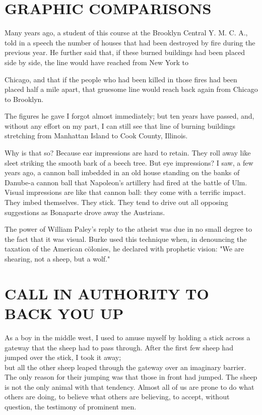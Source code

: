 \documentclass[10pt]{article}
\begin{document}
\section*{GRAPHIC COMPARISONS}
Many years ago, a student of this course at the Brooklyn Central Y. M. C. A., told in a speech the number of houses that had been destroyed by fire during the previous year. He further said that, if these burned buildings had been placed side by side, the line would have reached from New York to

Chicago, and that if the people who had been killed in those fires had been placed half a mile apart, that gruesome line would reach back again from Chicago to Brooklyn.

The figures he gave I forgot almost immediately; but ten years have passed, and, without any effort on my part, I can still see that line of burning buildings stretching from Manhattan Island to Cook County, Illinois.

Why is that so? Because ear impressions are hard to retain. They roll away like sleet striking the smooth bark of a beech tree. But eye impressions? I saw, a few years ago, a cannon ball imbedded in an old house standing on the banks of Danube-a cannon ball that Napoleon's artillery had fired at the battle of Ulm. Visual impressions are like that cannon ball: they come with a terrific impact. They imbed themselves. They stick. They tend to drive out all opposing suggestions as Bonaparte drove away the Austrians.

The power of William Paley's reply to the atheist was due in no small degree to the fact that it was visual. Burke used this technique when, in denouncing the taxation of the American cölonies, he declared with prophetic vision: "We are shearing, not a sheep, but a wolf."

\section*{CALL IN AUTHORITY TO BACK YOU UP}
As a boy in the middle west, I used to amuse myself by holding a stick across a gateway that the sheep had to pass through. After the first few sheep had jumped over the stick, I took it away;\\
but all the other sheep leaped through the gateway over an imaginary barrier. The only reason for their jumping was that those in front had jumped. The sheep is not the only animal with that tendency. Almost all of us are prone to do what others are doing, to believe what others are believing, to accept, without question, the testimony of prominent men.
\end{document}
